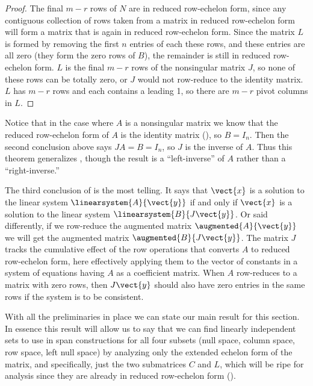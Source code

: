 \begin{proof}
%
The final $m-r$ rows of $N$ are in reduced row-echelon form, since any contiguous collection of rows taken from a matrix in reduced row-echelon form will form a matrix that is again in reduced row-echelon form.  Since the matrix $L$ is formed by removing the first $n$ entries of each these rows, and these entries are all zero (they form the zero rows of $B$), the remainder is still in reduced row-echelon form.  $L$ is the final $m-r$ rows of the nonsingular matrix $J$, so none of these rows can be totally zero, or $J$ would not row-reduce to the identity matrix.  $L$ has $m-r$ rows and each contains a leading 1, so there are $m-r$ pivot columns in $L$.\par
%
\end{proof}
%
Notice that in the case where $A$ is a nonsingular matrix we know that the reduced row-echelon form of $A$ is the identity matrix (), so $B=I_n$.  Then the second conclusion above says $JA=B=I_n$, so $J$ is the inverse of $A$.  Thus this theorem generalizes , though the result is a ``left-inverse'' of $A$ rather than a ``right-inverse.''\par
%
The third conclusion of  is the most telling.  It says that $\vect{x}$ is a solution to the linear system $\linearsystem{A}{\vect{y}}$ if and only if $\vect{x}$ is a solution to the linear system $\linearsystem{B}{J\vect{y}}$.  Or said differently, if we row-reduce the augmented matrix $\augmented{A}{\vect{y}}$ we will get the augmented matrix $\augmented{B}{J\vect{y}}$.  The matrix $J$ tracks the cumulative effect of the row operations that converts $A$ to reduced row-echelon form, here effectively applying them to the vector of constants in a system of equations having $A$ as a coefficient matrix.  When $A$ row-reduces to a matrix with zero rows, then $J\vect{y}$ should also have zero entries in the same rows if the system is to be consistent.\par
%
%
With all the preliminaries in place we can state our main result for this section.  In essence this result will allow us to say that we can find linearly independent sets to use in span constructions for all four subsets (null space, column space, row space, left null space) by analyzing only the extended echelon form of the matrix, and specifically, just the two submatrices $C$ and $L$, which will be ripe for analysis since they are already in reduced row-echelon form ().\par
